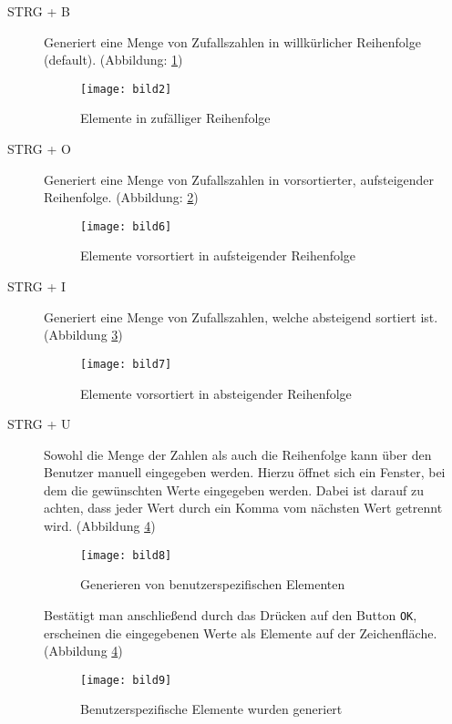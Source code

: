 \begin{description}
\item[STRG + B] Generiert eine Menge von Zufallszahlen in willkürlicher Reihenfolge (default). (Abbildung: \ref{figure:zufall})

\begin{figure}[!htb]
    \centering
      \texttt{[image: bild2]}
    \caption{Elemente in zufälliger Reihenfolge}
    \label{figure:zufall}
\end{figure}

\item[STRG + O] Generiert eine Menge von Zufallszahlen in vorsortierter, aufsteigender Reihenfolge. (Abbildung: \ref{figure:vorsortiert})

\begin{figure}[!htb]
    \centering
      \texttt{[image: bild6]}
    \caption{Elemente vorsortiert in aufsteigender Reihenfolge}
    \label{figure:vorsortiert}
\end{figure}

\item[STRG + I] Generiert eine Menge von Zufallszahlen, welche absteigend sortiert ist. (Abbildung \ref{figure:inverse})

\begin{figure}[!htb]
    \centering
      \texttt{[image: bild7]}
    \caption{Elemente vorsortiert in absteigender Reihenfolge}
    \label{figure:inverse}
\end{figure}

\item[STRG + U] Sowohl die Menge der Zahlen als auch die Reihenfolge kann über den Benutzer manuell eingegeben werden. Hierzu öffnet sich ein Fenster, bei dem die gewünschten Werte eingegeben werden. Dabei ist darauf zu achten, dass jeder Wert durch ein Komma vom nächsten Wert getrennt wird. (Abbildung \ref{figure:benutzer})

\begin{figure}[!htb]
    \centering
      \texttt{[image: bild8]}
    \caption{Generieren von benutzerspezifischen Elementen}
    \label{figure:benutzer}
\end{figure}

Bestätigt man anschließend durch das Drücken auf den Button \texttt{OK}, erscheinen die eingegebenen Werte als Elemente auf der Zeichenfläche. (Abbildung \ref{figure:benutzer})

\begin{figure}[!htb]
    \centering
      \texttt{[image: bild9]}
    \caption{Benutzerspezifische Elemente wurden generiert}
    \label{figure:benutzer2}
\end{figure}
\end{description}

